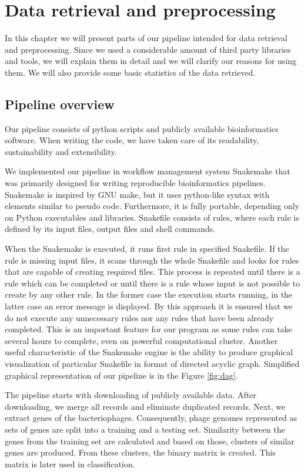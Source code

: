 \chapter{Data retrieval and preprocessing}
In this chapter we will present parts of our pipeline intended for data retrieval and preprocessing.
Since we used a considerable amount of third party libraries and tools, we will explain them in detail and we will clarify our reasons for using them.
We will also provide some basic statistics of the data retrieved.

\section{Pipeline overview}
Our pipeline consists of python scripts and publicly available bioinformatics software.
When writing the code, we have taken care of its readability, sustainability and extensibility.

We implemented our pipeline in  workflow management system Snakemake that was primarily designed for writing reproducible bioinformatics pipelines.
Snakemake is inspired by GNU make, but it uses python-like syntax with elements similar to pseudo code.
Furthermore, it is fully portable, depending only on Python executables and libraries.
Snakefile consists of rules, where each rule is defined by its input files, output files and shell commands.

When the Snakemake is executed, it runs first rule in specified Snakefile.
If the rule is missing input files, it scans through the whole Snakefile and looks for rules that are capable of creating required files.
This process is repeated until there is a rule which can be completed or until there is a rule whose input is not possible to create by any other rule.
In the former case the execution starts running, in the latter case an error message is displayed.
By this approach it is ensured that we do not execute any unnecessary rules nor any rules that have been already completed.
This is an important feature for our program as some rules can take several hours to complete, even on powerful computational cluster.
Another useful characteristic of the Snakemake engine is the ability to produce graphical visualization of particular Snakefile in format of directed acyclic graph.
Simplified graphical representation of our pipeline is in the Figure \ref{fig:dag}.

The pipeline starts with downloading of publicly available data.
After downloading, we merge all records and eliminate duplicated records.
Next, we extract genes of the bacteriophages.
Consequently, phage genomes represented as sets of genes are split into a training and a testing set.
Similarity between the genes from the training set are calculated and based on those, clusters of similar genes are produced.
From these clusters, the binary matrix is created.
This matrix is later used in classification.

